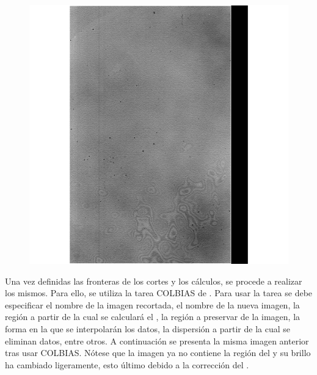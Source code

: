 \documentclass[12pt]{article}
\begin{document}
\begin{figure}[H]
  \centering
   \includegraphics[scale= 0.4]{im02.png}
  \label{im02}
\end{figure}


Una vez definidas las fronteras de los cortes y los cálculos, se procede a realizar los mismos. Para ello, se utiliza la tarea COLBIAS de  . Para usar la tarea se debe especificar el nombre de la imagen recortada, el nombre de la nueva imagen, la región a partir de la cual se calculará el , la región a preservar de la imagen, la forma en la que se interpolarán los datos, la dispersión a partir de la cual se eliminan datos, entre otros. A continuación se presenta la misma imagen anterior tras usar COLBIAS. Nótese que la imagen ya no contiene la región del  y su brillo ha cambiado ligeramente, esto último debido a la corrección del .
\end{document}
